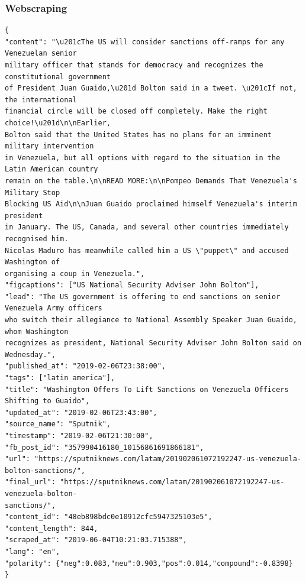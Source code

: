 \begin{frame}
\end{frame}
\begin{frame}[fragile]
 \frametitle{Webscraping}
 \tiny
 \begin{verbatim}
{
"content": "\u201cThe US will consider sanctions off-ramps for any Venezuelan senior 
military officer that stands for democracy and recognizes the constitutional government 
of President Juan Guaido,\u201d Bolton said in a tweet. \u201cIf not, the international 
financial circle will be closed off completely. Make the right choice!\u201d\n\nEarlier,
Bolton said that the United States has no plans for an imminent military intervention
in Venezuela, but all options with regard to the situation in the Latin American country
remain on the table.\n\nREAD MORE:\n\nPompeo Demands That Venezuela's Military Stop
Blocking US Aid\n\nJuan Guaido proclaimed himself Venezuela's interim president
in January. The US, Canada, and several other countries immediately recognised him.
Nicolas Maduro has meanwhile called him a US \"puppet\" and accused Washington of
organising a coup in Venezuela.",
"figcaptions": ["US National Security Adviser John Bolton"],
"lead": "The US government is offering to end sanctions on senior Venezuela Army officers
who switch their allegiance to National Assembly Speaker Juan Guaido, whom Washington
recognizes as president, National Security Adviser John Bolton said on Wednesday.",
"published_at": "2019-02-06T23:38:00", 
"tags": ["latin america"], 
"title": "Washington Offers To Lift Sanctions on Venezuela Officers Shifting to Guaido", 
"updated_at": "2019-02-06T23:43:00", 
"source_name": "Sputnik", 
"timestamp": "2019-02-06T21:30:00", 
"fb_post_id": "357990416180_10156861691866181", 
"url": "https://sputniknews.com/latam/201902061072192247-us-venezuela-bolton-sanctions/",
"final_url": "https://sputniknews.com/latam/201902061072192247-us-venezuela-bolton-
sanctions/",
"content_id": "48eb898bdc0e10912cfc5947325103e5",
"content_length": 844, 
"scraped_at": "2019-06-04T10:21:03.715388", 
"lang": "en", 
"polarity": {"neg":0.083,"neu":0.903,"pos":0.014,"compound":-0.8398}
}
 \end{verbatim}
\end{frame}
